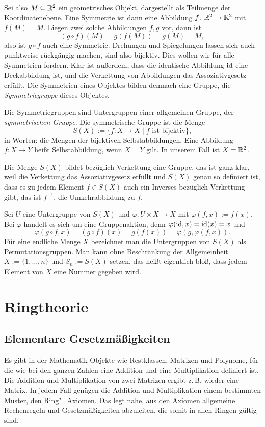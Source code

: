 Sei also $M\subseteq\mathbb R^2$ ein geometrisches Objekt, dargestellt als
Teilmenge der Koordinatenebene. Eine Symmetrie ist dann eine
Abbildung $f\colon\mathbb R^2\to\mathbb R^2$ mit $f(M)=M$. Liegen zwei solche
Abbildungen $f,g$ vor, dann ist
\[(g\circ f)(M) = g(f(M)) = g(M) = M,\]
also ist $g\circ f$ auch eine Symmetrie. Drehungen und Spiegelungen
lassen sich auch punktweise rückgängig machen, sind also bijektiv.
Dies wollen wir für alle Symmetrien fordern. Klar ist außerdem,
dass die identische Abbildung $\operatorname{id}$ eine Deckabbildung ist, und
die Verkettung von Abbildungen das Assoziativgesetz erfüllt.
Die Symmetrien eines Objektes bilden demnach eine Gruppe, die
\emph{Symmetriegruppe} dieses Objektes.

Die Symmetriegruppen sind Untergruppen einer allgemeinen Gruppe,
der \emph{symmetrischen Gruppe}. Die symmetrische Gruppe ist
die Menge
\[S(X) := \{f\colon X\to X\mid \text{$f$ ist bijektiv}\},\]
in Worten: die Mengen der bijektiven Selbstabbildungen. Eine
Abbildung $f\colon X\to Y$ heißt Selbstabbildung, wenn $X=Y$ gilt.
In unserem Fall ist $X=\mathbb R^2$.

Die Menge $S(X)$ bildet bezüglich Verkettung eine Gruppe, das ist
ganz klar, weil die Verkettung das Assoziativgesetz erfüllt und
$S(X)$ genau so definiert ist, dass es zu jedem Element $f\in S(X)$
auch ein Inverses bezüglich Verkettung gibt, das ist $f^{-1}$,
die Umkehrabbildung zu $f$.

Sei $U$ eine Untergruppe von $S(X)$ und $\varphi\colon U\times X\to X$
mit $\varphi(f,x):=f(x)$. Bei $\varphi$ handelt es sich um eine
Gruppenaktion, denn $\varphi(\operatorname{id},x)=\operatorname{id}(x)=x$ und
\[\varphi(g\circ f,x) = (g\circ f)(x) = g(f(x))
= \varphi(g,\varphi(f,x)).\]
Für eine endliche Menge $X$ bezeichnet man die Untergruppen von
$S(X)$ als Permutationsgruppen. Man kann ohne Beschränkung der
Allgemeinheit $X:=\{1,\ldots,n\}$ und $S_n:=S(X)$ setzen, das
heißt eigentlich bloß, dass jedem Element von $X$ eine Nummer
gegeben wird.

\section{Ringtheorie}

\subsection{Elementare Gesetzmäßigkeiten}

Es gibt in der Mathematik Objekte wie Restklassen, Matrizen
und Polynome, für die wie bei den ganzen Zahlen eine Addition und
eine Multiplikation definiert ist. Die Addition und Multiplikation
von zwei Matrizen ergibt z.\,B. wieder eine Matrix. In jedem Fall
genügen die Addition und Multiplikation einem bestimmten Muster, den
Ring"=Axiomen. Das legt nahe, aus den Axiomen allgemeine Rechenregeln
und Gesetzmäßigkeiten abzuleiten, die somit in allen Ringen gültig
sind.

